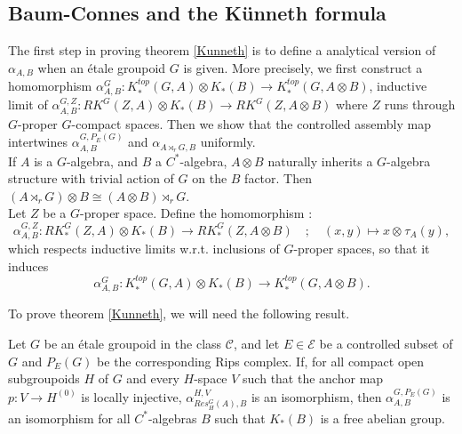 
\subsection{Baum-Connes and the Künneth formula}
The first step in proving theorem \ref{Kunneth} is to define a analytical version of $\alpha_{A,B}$ when an étale groupoid $G$ is given. More precisely, we first construct a homomorphism $\alpha_{A,B}^G : K_*^{top}(G,A)\otimes K_*(B)\rightarrow K_*^{top}(G,A\otimes B )$, inductive limit of $\alpha_{A,B}^{G,Z} : RK^G(Z,A)\otimes K_*(B)\rightarrow RK^G(Z,A\otimes B )$ where $Z$ runs through $G$-proper $G$-compact spaces. Then we show that the controlled assembly map intertwines $\alpha^{G,P_E(G)}_{A,B}$ and $\alpha_{A\rtimes_r G,B}$ uniformly.\\

If $A$ is a $G$-algebra, and $B$ a $C^*$-algebra, $A\otimes B$ naturally inherits a $G$-algebra structure with trivial action of $G$ on the $B$ factor. Then $(A\rtimes_r G)\otimes B \cong (A\otimes B)\rtimes_r G$.\\

Let $Z$ be a $G$-proper space. Define the homomorphism :
\[\alpha_{A,B}^{G,Z} : RK^G_*(Z,A)\otimes K_*(B)\rightarrow RK_*^G(Z,A\otimes B) \quad ; \quad (x,y)\mapsto x\otimes_{}   \tau_A(y),\]
which respects inductive limits w.r.t. inclusions of $G$-proper spaces, so that it induces
\[\alpha_{A,B}^G : K_*^{top}(G,A)\otimes K_*(B)\rightarrow K_*^{top}(G,A\otimes B ).\]

To prove theorem \ref{Kunneth}, we will need the following result.

\begin{thm}\label{TopologicalKunneth}
Let $G$ be an étale groupoid in the class $\mathcal C$, and let $E\in\mathcal E$ be a controlled subset of $G$ and $P_E(G)$ be the corresponding Rips complex. If, for all compact open subgroupoids $H$ of $G$ and every $H$-space $V$ such that the anchor map $p : V\rightarrow H^{(0)}$ is locally injective, $\alpha_{Res_H^G(A),B}^{H,V}$ is an isomorphism, then $\alpha_{A,B}^{G,P_E(G)}$ is an isomorphism for all $C^*$-algebras $B$ such that $K_*(B)$ is a free abelian group.
\end{thm}



